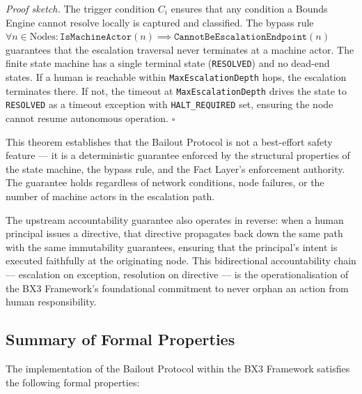 \bigskip

\noindent\textit{Proof sketch.} The trigger condition $C_i$ ensures that any
condition a Bounds Engine cannot resolve locally is captured and classified. The
bypass rule $\forall n \in \text{Nodes} : \texttt{IsMachineActor}(n) \implies
\texttt{CannotBeEscalationEndpoint}(n)$ guarantees that the escalation traversal never
terminates at a machine actor. The finite state machine has a single terminal state
(\texttt{RESOLVED}) and no dead-end states. If a human is reachable within
\texttt{MaxEscalationDepth} hops, the escalation terminates there. If not, the timeout
at \texttt{MaxEscalationDepth} drives the state to \texttt{RESOLVED} as a timeout
exception with \texttt{HALT\_REQUIRED} set, ensuring the node cannot resume autonomous
operation. $\square$

\bigskip

This theorem establishes that the Bailout Protocol is not a best-effort safety
feature — it is a deterministic guarantee enforced by the structural properties of
the state machine, the bypass rule, and the Fact Layer's enforcement authority. The
guarantee holds regardless of network conditions, node failures, or the number of
machine actors in the escalation path.

\bigskip

The upstream accountability guarantee also operates in reverse: when a human principal
issues a directive, that directive propagates back down the same path with the same
immutability guarantees, ensuring that the principal's intent is executed faithfully
at the originating node. This bidirectional accountability chain — escalation on
exception, resolution on directive — is the operationalisation of the BX3 Framework's
foundational commitment to never orphan an action from human responsibility.


\subsection{Summary of Formal Properties}
\label{sec:properties-summary}

The implementation of the Bailout Protocol within the BX3 Framework satisfies the
following formal properties:

\bigskip

